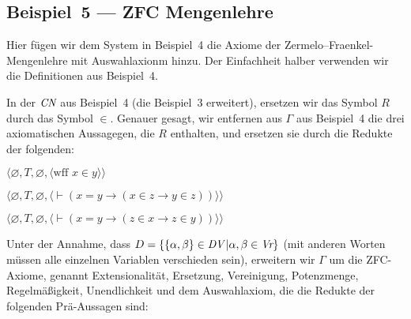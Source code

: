 \subsection{Beispiel~5 --- ZFC Mengenlehre}

Hier fügen wir dem System in Beispiel~4 die Axiome der Zermelo--Fraenkel-Mengenlehre mit Auswahlaxionm hinzu.  Der Einfachheit halber verwenden wir die Definitionen aus Beispiel~4. 

In der $\mbox{\em CN}$ aus Beispiel~4 (die Beispiel~3 erweitert), ersetzen wir das Symbol $R$ durch das Symbol $\in$. Genauer gesagt, wir entfernen aus $\Gamma$ aus Beispiel~4 die drei axiomatischen Aussagegen, die $R$ enthalten, und ersetzen sie durch die Redukte der folgenden: 
\begin{list}{}{\itemsep 0.0pt}
      \item[] $\langle\varnothing,T,\varnothing,
               \langle \mbox{wff\ }x\in y\rangle\rangle$
      \item[] $\langle\varnothing,T,
               \varnothing,
               \langle \vdash(x=y\to(x\in z\to y\in z))\rangle\rangle$
      \item[] $\langle\varnothing,T,
               \varnothing,
               \langle \vdash(x=y\to(z\in x\to z\in y))\rangle\rangle$
\end{list}
Unter der Annahme, dass $D=\{\{\alpha,\beta\}\in \mbox{\em DV}\,|\alpha,\beta\in \mbox{\em Vr}\}$ (mit anderen Worten müssen alle einzelnen Variablen verschieden sein), erweitern wir $\Gamma$ um die ZFC-Axiome, genannt 
Extensionalität,
Ersetzung,
Vereinigung,
Potenzmenge,
Regelmäßigkeit,
Unendlichkeit und
dem Auswahlaxiom, die die Redukte der folgenden Prä-Aussagen sind: 
